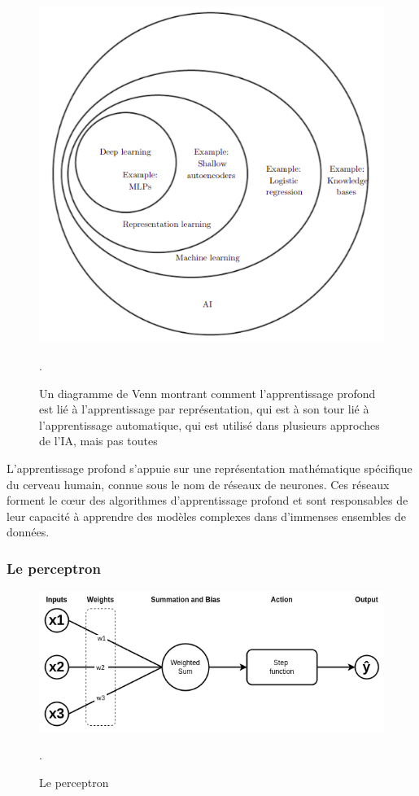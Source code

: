 \begin{figure}[H]
    \centering
    \includegraphics[width=12cm]{gfx/fig-dl-ml-ai.png}
    \caption{Un diagramme de Venn montrant comment l'apprentissage profond est lié à l'apprentissage par représentation, qui est à son tour lié à l'apprentissage automatique, qui est utilisé dans plusieurs approches de l'IA, mais pas toutes \cite{Goodfellow-et-al-2016}}.
    \label{fig:dl-ml-ai}
\end{figure}

L'apprentissage profond s'appuie sur une représentation mathématique spécifique du cerveau humain, connue sous le nom de réseaux de neurones. Ces réseaux forment le cœur des algorithmes d'apprentissage profond et sont responsables de leur capacité à apprendre des modèles complexes dans d'immenses ensembles de données. 

\subsubsection{Le perceptron}

\begin{figure}[H]
    \centering
    \includegraphics[width=12cm]{gfx/fig-perceptron.png}
    \caption{Le perceptron}.
    \label{fig:perceptron}
\end{figure}

